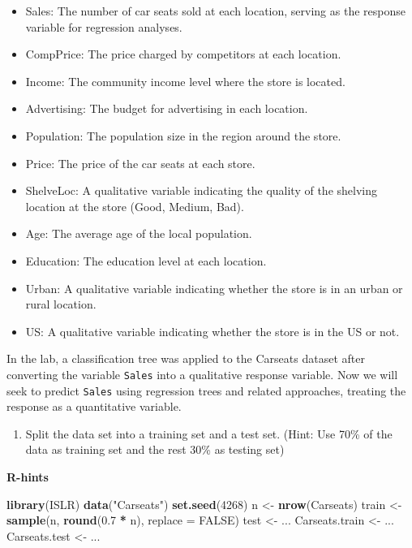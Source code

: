 \documentclass[
]{article}
\newenvironment{Shaded}{\begin{snugshade}}{\end{snugshade}}
\newcommand{\AttributeTok}[1]{\textcolor[rgb]{0.13,0.29,0.53}{#1}}
\newcommand{\ConstantTok}[1]{\textcolor[rgb]{0.56,0.35,0.01}{#1}}
\newcommand{\DecValTok}[1]{\textcolor[rgb]{0.00,0.00,0.81}{#1}}
\newcommand{\FloatTok}[1]{\textcolor[rgb]{0.00,0.00,0.81}{#1}}
\newcommand{\FunctionTok}[1]{\textcolor[rgb]{0.13,0.29,0.53}{\textbf{#1}}}
\newcommand{\NormalTok}[1]{#1}
\newcommand{\OtherTok}[1]{\textcolor[rgb]{0.56,0.35,0.01}{#1}}
\newcommand{\SpecialCharTok}[1]{\textcolor[rgb]{0.81,0.36,0.00}{\textbf{#1}}}
\newcommand{\StringTok}[1]{\textcolor[rgb]{0.31,0.60,0.02}{#1}}
\providecommand{\tightlist}{%
  \setlength{\itemsep}{0pt}\setlength{\parskip}{0pt}}
\begin{document}
\begin{itemize}
\tightlist
\item
  Sales: The number of car seats sold at each location, serving as the
  response variable for regression analyses.
\item
  CompPrice: The price charged by competitors at each location.
\item
  Income: The community income level where the store is located.
\item
  Advertising: The budget for advertising in each location.
\item
  Population: The population size in the region around the store.
\item
  Price: The price of the car seats at each store.
\item
  ShelveLoc: A qualitative variable indicating the quality of the
  shelving location at the store (Good, Medium, Bad).
\item
  Age: The average age of the local population.
\item
  Education: The education level at each location.
\item
  Urban: A qualitative variable indicating whether the store is in an
  urban or rural location.
\item
  US: A qualitative variable indicating whether the store is in the US
  or not.
\end{itemize}

In the lab, a classification tree was applied to the Carseats dataset
after converting the variable \texttt{Sales} into a qualitative response
variable. Now we will seek to predict \texttt{Sales} using regression
trees and related approaches, treating the response as a quantitative
variable.

\begin{enumerate}
\def\labelenumi{\alph{enumi})}
\tightlist
\item
  Split the data set into a training set and a test set. (Hint: Use 70\%
  of the data as training set and the rest 30\% as testing set)
\end{enumerate}

\textbf{R-hints}

\begin{Shaded}
\begin{Highlighting}[]
\FunctionTok{library}\NormalTok{(ISLR)}
\FunctionTok{data}\NormalTok{(}\StringTok{"Carseats"}\NormalTok{)}
\FunctionTok{set.seed}\NormalTok{(}\DecValTok{4268}\NormalTok{)}
\NormalTok{n }\OtherTok{\textless{}{-}} \FunctionTok{nrow}\NormalTok{(Carseats)}
\NormalTok{train }\OtherTok{\textless{}{-}} \FunctionTok{sample}\NormalTok{(n, }\FunctionTok{round}\NormalTok{(}\FloatTok{0.7} \SpecialCharTok{*}\NormalTok{ n), }\AttributeTok{replace =} \ConstantTok{FALSE}\NormalTok{)}
\NormalTok{test }\OtherTok{\textless{}{-}}\NormalTok{ ...}
\NormalTok{Carseats.train }\OtherTok{\textless{}{-}}\NormalTok{ ...}
\NormalTok{Carseats.test }\OtherTok{\textless{}{-}}\NormalTok{ ...}
\end{Highlighting}
\end{Shaded}
\end{document}
